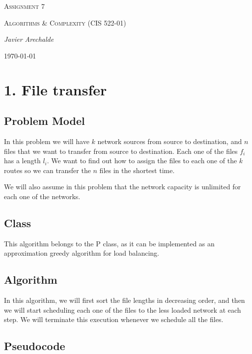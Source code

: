 \documentclass{article}
\begin{document}
\begin{titlepage}
	\centering
	{\scshape\LARGE Assignment 7\par}
	\vspace{1cm}
	{\scshape\Large Algorithms \& Complexity (CIS 522-01)\par}
	\vspace{1.5cm}
	{\Large\itshape Javier Arechalde\par}
	\vfill
	{\large \today\par}
\end{titlepage}

\section*{1. File transfer}

\subsection*{Problem Model}

In this problem we will have $k$ network sources from source to destination, and $n$ files that we want to transfer from source to destination. Each one of the files $f_i$ has a length $l_i$. We want to find out how to assign the files to each one of the $k$ routes so we can transfer the $n$ files in the shortest time.

We will also assume in this problem that the network capacity is unlimited for each one of the networks.

\subsection*{Class}

This algorithm belongs to the P class, as it can be implemented as an approximation greedy algorithm for load balancing.

\subsection*{Algorithm}

In this algorithm, we will first sort the file lengths in decreasing order, and then we will start scheduling each one of the files to the less loaded network at each step. We will terminate this execution whenever we schedule all the files.

\subsection*{Pseudocode}
\end{document}
